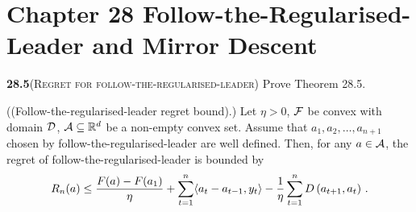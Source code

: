 \chapter*{Chapter 28 Follow-the-Regularised-Leader and Mirror Descent}
\label{sec:28}


\noindent\textbf{28.5}\textsc{(Regret for follow-the-regularised-leader)} Prove Theorem 28.5.

\begin{theorem}[Theorem 28.5]{((Follow-the-regularised-leader regret bound).)}
Let $\eta>0$, $\mathcal{F}$ be convex with domain $\mathcal{D}$, $\mathcal{A}\subseteq \mathbb{R}^d$ be a non-empty convex set. Assume that $a_1,a_2,\ldots,a_{n+1}$ chosen by follow-the-regularised-leader are well defined. Then, for any $a\in\mathcal{A}$, the regret of follow-the-regularised-leader is bounded by
\begin{align*}
    R_n(a) \le \frac{F(a)-F(a_1)}{\eta} + \sum_{t=1}^n \langle a_t-a_{t-1}, y_t \rangle - \frac{1}{\eta} \sum_{t=1}^n D\left( a_{t+1},a_t \right) \,.
\end{align*}
\end{theorem}